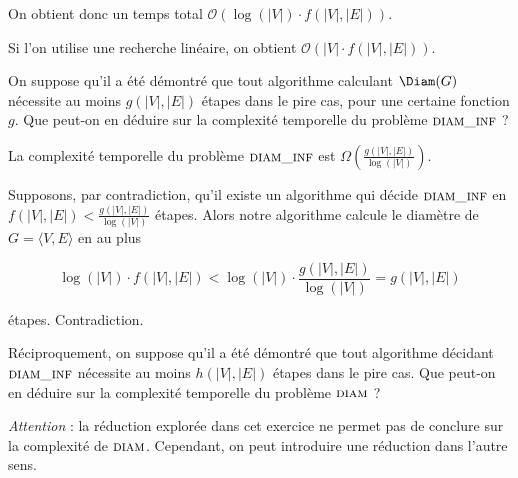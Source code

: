 \begin{exercice}
\begin{corrections}
\begin{enumerate}
      On obtient donc un temps total $\mathcal{O}\left(\log(|V|) \cdot f(|V|, |E|) \right)$.
      
      Si l'on utilise une recherche linéaire, on obtient $\mathcal{O}\left(|V| \cdot f(|V|, |E|) \right)$.
    \end{enumerate}
  \end{corrections}

  \begin{questions}
  \item On suppose qu'il a été démontré que tout algorithme calculant $\Diam(G)$
    nécessite au moins $g(|V|, |E|)$ étapes dans le pire cas, pour une certaine fonction $g$.
    Que peut-on en déduire sur la complexité temporelle du problème $\textsc{diam\_inf}$ ?
  \end{questions}
  \begin{corrections}
    La complexité temporelle du problème $\textsc{diam\_inf}$ est $\Omega(\frac{g(|V|, |E|)}{\log(|V|)})$.
    
    Supposons, par contradiction, qu'il existe un algorithme qui décide $\textsc{diam\_inf}$
    en $f(|V|, |E|) < \frac{g(|V|, |E|)}{\log(|V|)}$ étapes.
    Alors notre algorithme \Diam calcule le diamètre de $G = \langle V, E\rangle$ en
    au plus

    \vspace{-2mm}
    $$\log(|V|) \cdot f(|V|, |E|) < \log(|V|) \cdot \frac{g(|V|, |E|)}{\log(|V|)} = g(|V|, |E|)$$

    \vspace{-2mm}
    étapes.
    Contradiction.
  \end{corrections}
  
  \begin{questions}
  \item Réciproquement, on suppose qu'il a été démontré que tout algorithme décidant
    $\textsc{diam\_inf}$ nécessite au moins $h(|V|, |E|)$ étapes dans le pire cas.
    Que peut-on en déduire sur la complexité temporelle du problème $\textsc{diam}$ ?
  \end{questions}
  \begin{corrections}
    \emph{Attention} : la réduction explorée dans cet exercice ne permet pas de conclure sur la
    complexité de $\textsc{diam}$. Cependant, on peut introduire une réduction dans l'autre sens.
    
    \begin{algorithm}[H]
    \end{algorithm}


\end{corrections}
\end{exercice}
